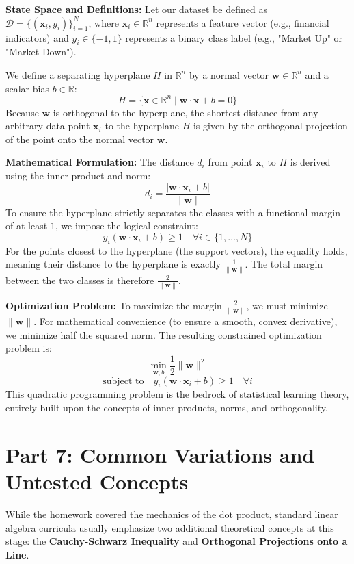 \documentclass[11pt, letterpaper]{article}
\theoremstyle{definition}
\theoremstyle{remark}
\newcommand{\R}{\mathbb{R}}
\begin{document}
\textbf{State Space and Definitions:}
Let our dataset be defined as $\mathcal{D} = \{(\mathbf{x}_i, y_i)\}_{i=1}^N$, where $\mathbf{x}_i \in \R^n$ represents a feature vector (e.g., financial indicators) and $y_i \in \{-1, 1\}$ represents a binary class label (e.g., "Market Up" or "Market Down").

We define a separating hyperplane $H$ in $\R^n$ by a normal vector $\mathbf{w} \in \R^n$ and a scalar bias $b \in \R$:
\[ H = \{\mathbf{x} \in \R^n \mid \mathbf{w} \cdot \mathbf{x} + b = 0\} \]
Because $\mathbf{w}$ is orthogonal to the hyperplane, the shortest distance from any arbitrary data point $\mathbf{x}_i$ to the hyperplane $H$ is given by the orthogonal projection of the point onto the normal vector $\mathbf{w}$. 

\textbf{Mathematical Formulation:}
The distance $d_i$ from point $\mathbf{x}_i$ to $H$ is derived using the inner product and norm:
\[ d_i = \frac{|\mathbf{w} \cdot \mathbf{x}_i + b|}{\|\mathbf{w}\|} \]
To ensure the hyperplane strictly separates the classes with a functional margin of at least $1$, we impose the logical constraint:
\[ y_i(\mathbf{w} \cdot \mathbf{x}_i + b) \ge 1 \quad \forall i \in \{1, \dots, N\} \]
For the points closest to the hyperplane (the support vectors), the equality holds, meaning their distance to the hyperplane is exactly $\frac{1}{\|\mathbf{w}\|}$. The total margin between the two classes is therefore $\frac{2}{\|\mathbf{w}\|}$.

\textbf{Optimization Problem:}
To maximize the margin $\frac{2}{\|\mathbf{w}\|}$, we must minimize $\|\mathbf{w}\|$. For mathematical convenience (to ensure a smooth, convex derivative), we minimize half the squared norm. The resulting constrained optimization problem is:
\[ \min_{\mathbf{w}, b} \frac{1}{2} \|\mathbf{w}\|^2 \]
\[ \text{subject to} \quad y_i(\mathbf{w} \cdot \mathbf{x}_i + b) \ge 1 \quad \forall i \]
This quadratic programming problem is the bedrock of statistical learning theory, entirely built upon the concepts of inner products, norms, and orthogonality.

\newpage
\section{Part 7: Common Variations and Untested Concepts}

While the homework covered the mechanics of the dot product, standard linear algebra curricula usually emphasize two additional theoretical concepts at this stage: the \textbf{Cauchy-Schwarz Inequality} and \textbf{Orthogonal Projections onto a Line}.
\end{document}
